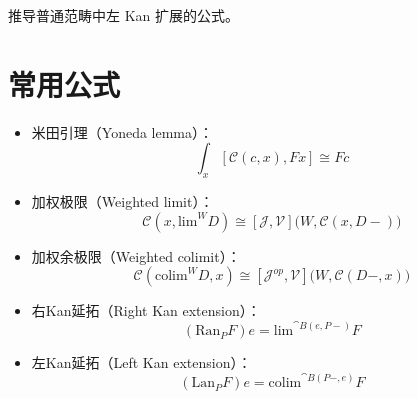 \documentclass[DaoFP]{subfiles}
\begin{document}
\begin{exercise}
推导普通范畴中左 Kan 扩展的公式。
\end{exercise}

\section{常用公式}
\begin{itemize}
\item 米田引理（Yoneda lemma）：
\[ \int_x [\mathcal C( c, x), F x] \cong F c \]
\item 加权极限（Weighted limit）：
\[  \mathcal C(x, \text{lim}^W D) \cong [\mathcal J, \mathcal V] \big(W, \mathcal C(x, D-)\big) \]
\item 加权余极限（Weighted colimit）：
\[  \mathcal C(\text{colim}^W D, x) \cong [\mathcal J^{op}, \mathcal V] \big(W, \mathcal C(D-, x)\big) \]
\item 右Kan延拓（Right Kan extension）：
\[ (\text{Ran}_P F) e = \text{lim}^{\cat B(e, P-)} F  \]
\item 左Kan延拓（Left Kan extension）：
\[ (\text{Lan}_P F) e = \text{colim}^{\cat B(P-, e)} F \]
\end{itemize}
\end{document}
